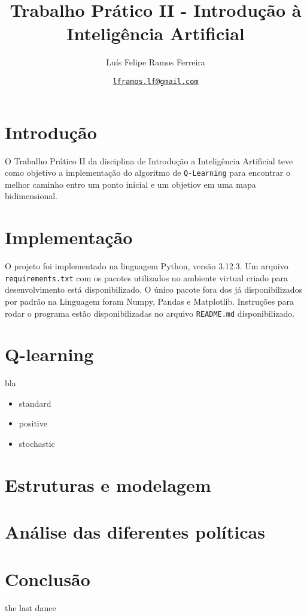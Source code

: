 \documentclass{article}
\title{Trabalho Prático II - Introdução à Inteligência Artificial}
\author{Luís Felipe Ramos Ferreira}
\date{\href{mailto:lframos.lf@gmail.com}{\texttt{lframos.lf@gmail.com}}
}
\begin{document}
\maketitle

\section{Introdução}

O Trabalho Prático II da disciplina de Introdução a Inteligência Artificial teve como objetivo a implementação do algoritmo de \texttt{Q-Learning}
para encontrar o melhor caminho entro um ponto inicial e um objetiov em uma mapa bidimensional.

\section{Implementação}

O projeto foi implementado na linguagem Python, versão 3.12.3. Um arquivo \texttt{requirements.txt} com os pacotes utilizados no ambiente virtual criado para desenvolvimento
está disponibilizado. O único pacote fora dos já disponibilizados por padrão na Linguagem foram Numpy, Pandas e Matplotlib. Instruções para rodar o programa estão disponibilizadas no
arquivo \texttt{README.md} disponibilizado.

\section{Q-learning}

bla

\begin{itemize}
	\item standard
	\item positive
	\item stochastic
\end{itemize}

\section{Estruturas e modelagem}


\section{Análise das diferentes políticas}

\section{Conclusão}

the last dance
\end{document}
